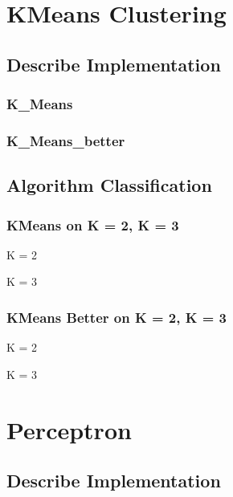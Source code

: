 \documentclass{article}
\begin{document}
	\section{KMeans Clustering}
	\subsection{Describe Implementation}
	
	\subsubsection{K\_Means}
	\subsubsection{K\_Means\_better}
	
	\subsection{Algorithm Classification}
	\subsubsection{KMeans on K = 2, K = 3}
	\begin{center}
		K = 2
	\end{center}
	\begin{center}
		K = 3
	\end{center}
	
	\subsubsection{KMeans Better on K = 2, K = 3}
	\begin{center}
		K = 2
	\end{center}
	\begin{center}
		K = 3
	\end{center}
	
	\section{Perceptron}
	\subsection{Describe Implementation}
\end{document}
